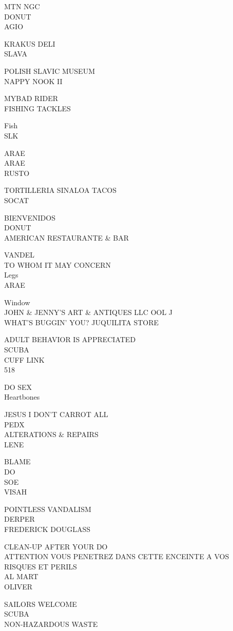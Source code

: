 \documentclass[10pt,letterpaper]{article}
\begin{document}
MTN NGC\\
DONUT\\
AGIO

KRAKUS DELI\\
SLAVA

POLISH SLAVIC MUSEUM\\
NAPPY NOOK II

MYBAD RIDER\\
FISHING TACKLES

Fish\\
SLK

ARAE\\
ARAE\\
RUSTO

TORTILLERIA SINALOA TACOS\\
SOCAT

BIENVENIDOS\\
DONUT\\
AMERICAN RESTAURANTE \& BAR

VANDEL\\
TO WHOM IT MAY CONCERN\\
Legs\\
ARAE

Window\\
JOHN \& JENNY'S ART \& ANTIQUES LLC OOL J\\
WHAT'S BUGGIN' YOU? JUQUILITA STORE

ADULT BEHAVIOR IS APPRECIATED\\
SCUBA\\
CUFF LINK\\
518

DO SEX\\
Heartbones

JESUS I DON'T CARROT ALL\\
PEDX\\
ALTERATIONS \& REPAIRS\\
LENE

BLAME\\
DO\\
SOE\\
VISAH

POINTLESS VANDALISM\\
DERPER\\
FREDERICK DOUGLASS

CLEAN{-}UP AFTER YOUR DO\\
ATTENTION VOUS PENETREZ DANS CETTE ENCEINTE A VOS RISQUES ET PERILS\\
AL MART\\
OLIVER

SAILORS WELCOME\\
SCUBA\\
NON{-}HAZARDOUS WASTE
\end{document}
